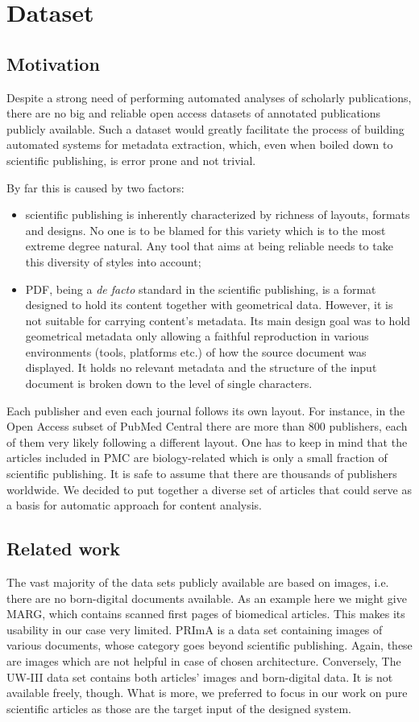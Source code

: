 \chapter{Dataset}\label{sec:dataset}
\section{Motivation}
Despite a strong need of performing automated analyses of scholarly publications, there are no big and reliable open access datasets of annotated publications publicly available. Such a dataset would greatly facilitate the process of building automated systems for metadata extraction, which, even when boiled down to scientific publishing, is error prone and not trivial.

By far this is caused by two factors:
\begin{itemize}
\item scientific publishing is inherently characterized by richness of layouts, formats and designs. No one is to be blamed for this variety which is to the most extreme degree natural. Any tool that aims at being reliable needs to take this diversity of styles into account;

\item PDF, being a \textit{de facto} standard in the scientific publishing, is a format designed to hold its content together with geometrical data. However, it is not suitable for carrying content's metadata. Its main design goal was to hold geometrical metadata only allowing a faithful reproduction in various environments (tools, platforms etc.) of how the source document was displayed. It holds no relevant metadata and the structure of the input document is broken down to the level of single characters.
\end{itemize}

Each publisher and even each journal follows its own layout. For instance, in the Open Access subset of PubMed Central there are more than 800 publishers, each of them very likely following a different layout. One has to keep in mind that the articles included in PMC are biology-related which is only a small fraction of scientific publishing. It is safe to assume that there are thousands of publishers worldwide. We decided to put together a diverse set of articles that could serve as a basis for automatic approach for content analysis. 

\section{Related work}
The vast majority of the data sets publicly available are based on images, i.e. there are no born-digital documents available. As an example here we might give MARG, which contains scanned first pages of biomedical articles. This makes its usability in our case very limited. PRImA is a data set containing images of various documents, whose category goes beyond scientific publishing. Again, these are images which are not helpful in case of chosen architecture. Conversely, The UW-III data set contains both articles' images and born-digital data. It is not available freely, though. What is more, we preferred to focus in our work on pure scientific articles as those are the target input of the designed system.
